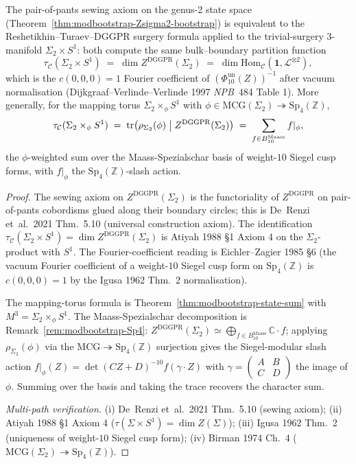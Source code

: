 \begin{theorem}
\label{thm:modbootstrap-sewing-equivalence}
The pair-of-pants sewing axiom on the genus-2 state space
(Theorem~\ref{thm:modbootstrap-Zsigma2-bootstrap}) is
equivalent to the Reshetikhin--Turaev--DGGPR surgery formula applied
to the trivial-surgery 3-manifold $\Sigma_2\times S^1$: both compute
the same bulk--boundary partition function
\[
 \tau_{\mathcal C}(\Sigma_2\times S^1)
 \;=\;
 \dim Z^{\mathrm{DGGPR}}(\Sigma_2)
 \;=\;
 \dim\mathrm{Hom}_{\mathcal C}(\mathbf 1, \mathcal L^{\otimes 2}),
\]
which is the $c(0, 0, 0) = 1$ Fourier coefficient of
$(\Phi_{10}^{\mathrm{un}}(Z))^{-1}$ after vacuum normalisation
(Dijkgraaf--Verlinde--Verlinde 1997 \emph{NPB}~484 Table 1). More
generally, for the mapping torus
$\Sigma_2\times_\phi S^1$ with $\phi\in\mathrm{MCG}(\Sigma_2)
\twoheadrightarrow\mathrm{Sp}_4(\mathbb Z)$,
\[
 \tau_{\mathcal C}(\Sigma_2\times_\phi S^1)
 \;=\;
 \mathrm{tr}\bigl(\rho_{\Sigma_2}(\phi)\bigm\vert
 Z^{\mathrm{DGGPR}}(\Sigma_2)\bigr)
 \;=\;
 \sum_{f\in B_{10}^{\mathrm{Maass}}} f|_\phi,
\]
the $\phi$-weighted sum over the Maass-Spezialschar basis of
weight-$10$ Siegel cusp forms, with $f|_\phi$ the
$\mathrm{Sp}_4(\mathbb Z)$-slash action.
\end{theorem}

\begin{proof}
The sewing axiom on $Z^{\mathrm{DGGPR}}(\Sigma_2)$ is the functoriality
of $Z^{\mathrm{DGGPR}}$ on pair-of-pants cobordisms glued along their
boundary circles; this is De~Renzi et~al.\ 2021 Thm.~5.10 (universal
construction axiom). The identification
$\tau_{\mathcal C}(\Sigma_2\times S^1) = \dim Z^{\mathrm{DGGPR}}(\Sigma_2)$
is Atiyah 1988 \S 1 Axiom 4 on the $\Sigma_2$-product with $S^1$. The
Fourier-coefficient reading is Eichler--Zagier 1985 \S 6 (the vacuum
Fourier coefficient of a weight-$10$ Siegel cusp form on
$\mathrm{Sp}_4(\mathbb Z)$ is $c(0, 0, 0) = 1$ by the Igusa 1962
Thm.~2 normalisation).

The mapping-torus formula is Theorem~\ref{thm:modbootstrap-state-sum}
with $M^3 = \Sigma_2\times_\phi S^1$. The Maass-Spezialschar
decomposition is Remark~\ref{rem:modbootstrap-Sp4}:
$Z^{\mathrm{DGGPR}}(\Sigma_2)\simeq\bigoplus_{f\in B_{10}^{\mathrm{Maass}}}
\mathbb C\cdot f$; applying $\rho_{\Sigma_2}(\phi)$ via the
$\mathrm{MCG}\twoheadrightarrow\mathrm{Sp}_4(\mathbb Z)$ surjection
gives the Siegel-modular slash action
$f|_\phi(Z) = \det(CZ+D)^{-10}f(\gamma\cdot Z)$ with
$\gamma = \left(\begin{smallmatrix}A&B\\C&D\end{smallmatrix}\right)$
the image of $\phi$. Summing over the basis and taking the trace
recovers the character sum.

\emph{Multi-path verification.}
(i) De~Renzi et~al.\ 2021 Thm.~5.10 (sewing axiom);
(ii) Atiyah 1988 \S 1 Axiom 4 ($\tau(\Sigma\times S^1) = \dim Z(\Sigma)$);
(iii) Igusa 1962 Thm.~2 (uniqueness of weight-$10$ Siegel cusp form);
(iv) Birman 1974 Ch.~4 ($\mathrm{MCG}(\Sigma_2)
\twoheadrightarrow\mathrm{Sp}_4(\mathbb Z)$).
\end{proof}

